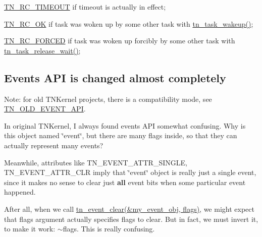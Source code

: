 \begin{DoxyItemize}
\item {\ttfamily \hyperlink{tn__common_8h_aa43bd3da1ad4c1e61224b5f23b369876a5b4d73fde6b5d1c9579c02e6aafce1fb}{T\+N\+\_\+\+R\+C\+\_\+\+T\+I\+M\+E\+O\+U\+T}} if timeout is actually in effect;
\item {\ttfamily \hyperlink{tn__common_8h_aa43bd3da1ad4c1e61224b5f23b369876afb291924237186f5765865256c75e639}{T\+N\+\_\+\+R\+C\+\_\+\+O\+K}} if task was woken up by some other task with {\ttfamily \hyperlink{tn__tasks_8h_abb88bc8b1cec6b82e7b6e2e90d0e155a}{tn\+\_\+task\+\_\+wakeup()}};
\item {\ttfamily \hyperlink{tn__common_8h_aa43bd3da1ad4c1e61224b5f23b369876ae5cbacb0fb01805c9003046c08bf4356}{T\+N\+\_\+\+R\+C\+\_\+\+F\+O\+R\+C\+E\+D}} if task was woken up forcibly by some other task with {\ttfamily \hyperlink{tn__tasks_8h_ae90ecdbd7d87d050c2c98ec775e6efc7}{tn\+\_\+task\+\_\+release\+\_\+wait()}};
\end{DoxyItemize}\hypertarget{tnkernel_diff_tnkernel_diff_event}{}\subsection{Events A\+P\+I is changed almost completely}\label{tnkernel_diff_tnkernel_diff_event}
Note\+: for old T\+N\+Kernel projects, there is a compatibility mode, see {\ttfamily \hyperlink{tn__cfg__default_8h_ac61d5f6a716cdcab205a2c8afbde4242}{T\+N\+\_\+\+O\+L\+D\+\_\+\+E\+V\+E\+N\+T\+\_\+\+A\+P\+I}}.

In original T\+N\+Kernel, I always found events A\+P\+I somewhat confusing. Why is this object named \char`\"{}event\char`\"{}, but there are many flags inside, so that they can actually represent many events?

Meanwhile, attributes like {\ttfamily T\+N\+\_\+\+E\+V\+E\+N\+T\+\_\+\+A\+T\+T\+R\+\_\+\+S\+I\+N\+G\+L\+E}, {\ttfamily T\+N\+\_\+\+E\+V\+E\+N\+T\+\_\+\+A\+T\+T\+R\+\_\+\+C\+L\+R} imply that \char`\"{}event\char`\"{} object is really just a single event, since it makes no sense to clear just {\bfseries all} event bits when some particular event happened.

After all, when we call {\ttfamily \hyperlink{tn__oldsymbols_8h_aee4d9866fcfb8b9b6a96066b288150dc}{tn\+\_\+event\+\_\+clear(\&my\+\_\+event\+\_\+obj, flags)}}, we might expect that {\ttfamily flags} argument actually specifies flags to clear. But in fact, we must invert it, to make it work\+: {\ttfamily $\sim$flags}. This is really confusing.

